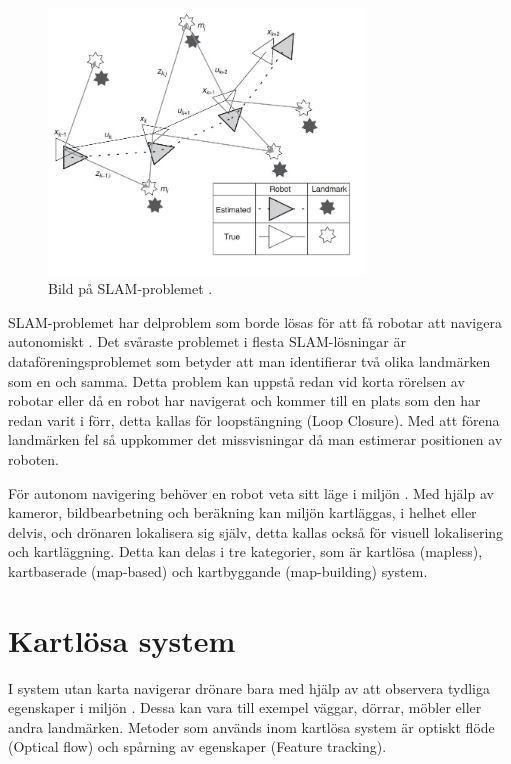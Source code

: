 \begin{figure}[ht]
    \begin{center}
    \includegraphics[width=0.75\textwidth]{slam-problem.JPG}
    \caption{Bild på SLAM-problemet \citep{realslamproblem}.}
    \label{slam-problemet}
    \end{center}
\end{figure}

SLAM-problemet har delproblem som borde lösas för att få robotar att navigera autonomiskt \citep{slamproblem}. Det svåraste problemet i flesta SLAM-lösningar är dataföreningsproblemet som betyder att man identifierar två olika landmärken som en och samma. Detta problem kan uppstå redan vid korta rörelsen av robotar eller då en robot har navigerat och kommer till en plats som den har redan varit i förr, detta kallas för loopstängning (Loop Closure). Med att förena landmärken fel så uppkommer det missvisningar då man estimerar positionen av roboten.

För autonom navigering behöver en robot veta sitt läge i miljön \citep{geospatial}. Med hjälp av kameror, bildbearbetning och beräkning kan miljön kartläggas, i helhet eller delvis, och drönaren lokalisera sig själv, detta kallas också för visuell lokalisering och kartläggning. Detta kan delas i tre kategorier, som är kartlösa (mapless), kartbaserade (map-based) och kartbyggande (map-building) system. 

\section{Kartlösa system}

I system utan karta navigerar drönare bara med hjälp av att observera tydliga egenskaper i miljön \citep{982903}. Dessa kan vara till exempel väggar, dörrar, möbler eller andra landmärken. Metoder som används inom kartlösa system är optiskt flöde (Optical flow) och spårning av egenskaper (Feature tracking). 


